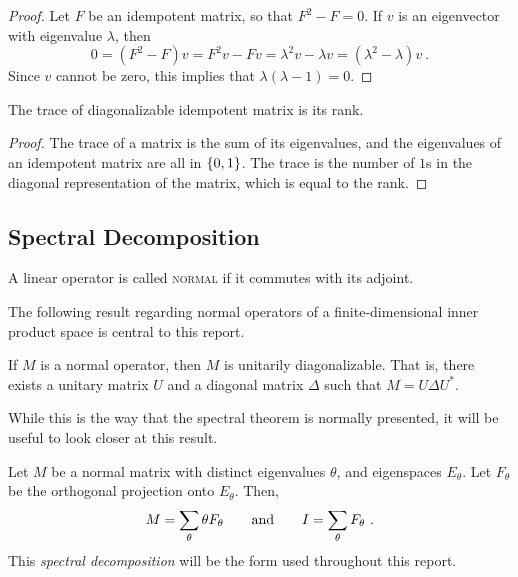 \documentclass{report}
\begin{document}
      \begin{proof}
        Let $F$ be an idempotent matrix, so that $F^2 - F = 0$.  If $v$ is an
        eigenvector with eigenvalue $\lambda$, then
        $$
          0 =(F^2 - F)v = F^2v - Fv = \lambda^2 v - \lambda v = (\lambda^2 -
          \lambda)v \ .
        $$
        Since $v$ cannot be zero, this implies that $\lambda(\lambda - 1) = 0$.
      \end{proof}

      \begin{prop}\label{prop:trace-rank}
        The trace of diagonalizable idempotent matrix is its rank.
      \end{prop}

      \begin{proof}
        The trace of a matrix is the sum of its eigenvalues, and the eigenvalues
        of an idempotent matrix are all in $\left\lbrace 0, 1 \right\rbrace$.  The trace is the
        number of $1$s in the diagonal representation of the matrix, which is
        equal to the rank.
      \end{proof}

    \subsection{Spectral Decomposition}

      \begin{defn}
        A linear operator is called \textsc{normal} if it commutes with its
        adjoint.
      \end{defn}

      The following result regarding normal operators of a finite-dimensional
      inner product space is central to this report.

      \begin{thm}\label{thm:spectral}
        If $M$ is a normal operator, then $M$ is unitarily diagonalizable.  That
        is, there exists a unitary matrix $U$ and a diagonal matrix $\Delta$
        such that $M = U\Delta U^*$.
      \end{thm}

      While this is the way that the spectral theorem is normally presented, it
      will be useful to look closer at this result.

      Let $M$ be a normal matrix with distinct eigenvalues $\theta$, and
      eigenspaces $E_\theta$.  Let $F_\theta$ be the orthogonal projection onto
      $E_\theta$.  Then,
      $$
        M = \sum_\theta \theta F_\theta \quad\quad\text{and}\quad\quad
        I = \sum_\theta F_\theta \ .
      $$
      This \textit{spectral decomposition} will be the form used throughout this
      report.
\end{document}
